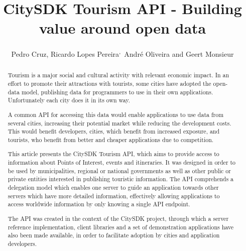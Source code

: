 \documentclass[times]{ettauth}
\begin{document}




\title{CitySDK Tourism API - Building value around open data}
\author{Pedro Cruz,
Ricardo Lopes Pereira\textsuperscript{,}\corrauth\,
Andr\'e Oliveira and 
Geert Monsieur}
\address{
 Instituto Superior T\'ecnico, Avenida Rovisco Pais 1, 1049-001 Lisboa, Portugal\\
 INESC-ID, Av. Prof. Dr. Cavaco Silva, 2744-016 Porto Salvo, Portugal\\
 ISA - Intelligent Sensing Anywhere S.A, Rua D. Manuel I, 30, 3030-320 Coimbra, Portugal\\
 European Research Institute in Service Science (ERISS), Tilburg University, Warandelaan 2, 5037AB Tilburg, The Netherlands
}

\begin{abstract}
Tourism is a major social and cultural activity with relevant economic impact.
In an effort to promote their attractions with tourists, some cities have adopted the open-data model, publishing data for programmers to use in their own applications.
Unfortunately each city does it in its own way.

A common API for accessing this data would enable applications to use data from several cities, increasing their potential market while reducing the development costs.
This would benefit developers, cities, which benefit from increased exposure, and tourists, who benefit from better and cheaper applications due to competition.

This article presents the CitySDK Tourism API, which aims to provide access to information about Points of Interest, events and itineraries.
It was designed in order to be used by municipalities, regional or national governments as well as other public or private entities interested in publishing touristic information.
The API comprehends a delegation model which enables one server to guide an application towards other servers which have more detailed information, effectively allowing applications to access worldwide information by only knowing a single API endpoint.

The API was created in the context of the CitySDK project, through which a server reference implementation, client libraries and a set of demonstration applications have also been made available, in order to facilitate adoption by cities and application developers.

\end{abstract}
\end{document}
